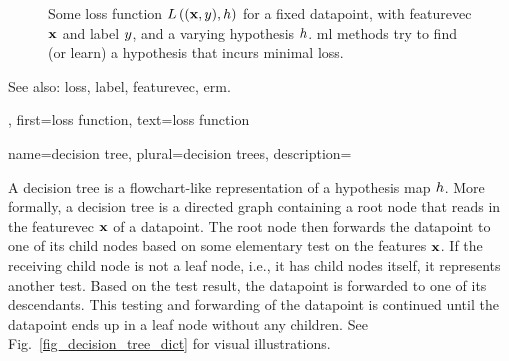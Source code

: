 {{\begin{figure}[H]
\begin{center}
\begin{tikzpicture}[scale = 0.7,%
        			every axis/.append style={
          			axis line style={-Latex, thick},
          			tick style={thick}
        			}]
				\end{tikzpicture}
			\end{center}
			\vspace*{-7mm}
			\caption{Some \gls{loss} \gls{function} $\lossfunc{(\featurevec,\truelabel)}{\hypothesis}$ for a fixed \gls{datapoint}, with 
				\gls{featurevec} $\featurevec$ and \gls{label} $\truelabel$, and a varying \gls{hypothesis} $\hypothesis$. 
				\gls{ml} methods try to find (or learn) a \gls{hypothesis} that incurs minimal \gls{loss}.}
			\label{fig_loss_function_gls_dict}
		\end{figure}
		See also: \gls{loss}, \gls{label}, \gls{featurevec}, \gls{erm}.},
 	first={loss function},
 	text={loss function} 
}

{name={decision tree}, plural={decision trees}, 
	description={A 
		decision tree is a flowchart-like representation of a \gls{hypothesis} \gls{map} $\hypothesis$. 
		More formally, a decision tree is a directed \gls{graph} containing a root node that reads 
		in the \gls{featurevec} $\featurevec$ of a \gls{datapoint}. The root node then forwards 
		the \gls{datapoint} to one of its child nodes based on some elementary test on the \glspl{feature} $\featurevec$. 
		If the receiving child node is not a leaf node, i.e., it has child nodes itself, 
	  	it represents another test. Based on the test result, the \gls{datapoint} is forwarded 
	   	to one of its descendants. This testing and forwarding of the \gls{datapoint} is continued 
	  	until the \gls{datapoint} ends up in a leaf node without any children. See Fig.\ \ref{fig_decision_tree_dict} for visual illustrations.
		\begin{figure}[H]
		\begin{minipage}{.45\textwidth}
\end{minipage}
\end{figure}}}
